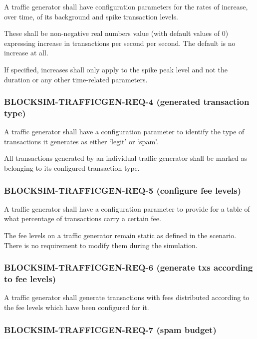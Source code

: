 \documentclass{scrreprt}
\begin{document}
        A traffic generator shall have configuration parameters for the rates
        of increase, over time, of its background and spike transaction levels.

        These shall be non-negative real numbers value (with default values of
        0) expressing increase in transactions per second per second.
        The default is no increase at all.

        If specified, increases shall only apply to the spike peak level and
        not the duration or any other time-related parameters.

      \subsubsection{BLOCKSIM-TRAFFICGEN-REQ-4 (generated transaction type)}

        A traffic generator shall have a configuration parameter to
        identify the type of transactions it generates as either `legit' or
        `spam'.

        All transactions generated by an individual traffic generator shall
        be marked as belonging to its configured transaction type.

      \subsubsection{BLOCKSIM-TRAFFICGEN-REQ-5 (configure fee levels)}

        A traffic generator shall have a configuration parameter to
        provide for a table of what percentage of transactions carry a certain
        fee.

        The fee levels on a traffic generator remain static as defined in the
        scenario.
        There is no requirement to modify them during the simulation.

      \subsubsection{BLOCKSIM-TRAFFICGEN-REQ-6 (generate txs according to fee levels)}

        A traffic generator shall generate transactions with fees distributed
        according to the fee levels which have been configured for it.

      \subsubsection{BLOCKSIM-TRAFFICGEN-REQ-7 (spam budget)}
\end{document}
